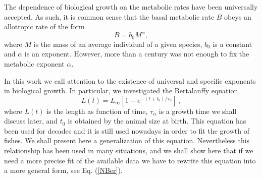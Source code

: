The dependence of biological growth on the metabolic rates have been universally accepted. As such, it is common sense that the basal metabolic rate $B$ obeys an allotropic rate of the form \cite{Bertalanffy38a,Bertalanffy57,West97,West99,Brown05,Hatton15,Cebrian16,Rubner1883,Kleiber32,Banavar10,Agutter11}
\begin{equation}
B = b_0M^{\alpha},
\end{equation}
where $M$ is the mass of an average individual of a given species, $b_0$ is a constant and $\alpha$ is an exponent. However, more than a century was not enough to fix the  metabolic exponent $\alpha$.

In this work we call attention to the existence of universal and specific exponents in biological growth. In particular, we investigated the Bertalanffy equation \cite{Bertalanffy38a,Bertalanffy57}
\begin{equation}
L(t) = L_\infty \left[ 1 - e^{-(t+t_0)/\tau_\alpha} \right]\,,
\label{Ber}
\end{equation}
where $L(t)$ is the length as function of time, $\tau_\alpha$ is a growth time we shall discuss later, and $t_0$ is obtained by the animal size at birth. This equation has been used for decades and it is still used nowadays  in order to fit
the growth of fishes. We shall present here a generalization of this equation. Nevertheless this relationship has been used in many situations, and we shall show here that if we need a more precise fit of the available data we have to rewrite this equation into a more general form, see
Eq. (\ref{NBer}).

